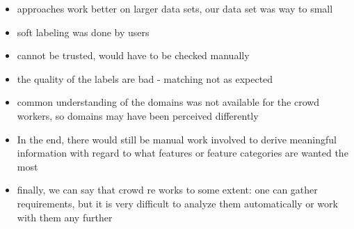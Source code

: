\begin{itemize}
\item approaches work better on larger data sets, our data set was way to small
\item soft labeling was done by users
\item cannot be trusted, would have to be checked manually
\item the quality of the labels are bad - matching not as expected
\item common understanding of the domains was not available for the crowd workers, so domains may have been perceived differently
\item In the end, there would still be manual work involved to derive meaningful information with regard to what features or feature categories are wanted the most
\item finally, we can say that crowd re works to some extent: one can gather requirements, but it is very difficult to analyze them automatically or work with them any further 
\end{itemize}

